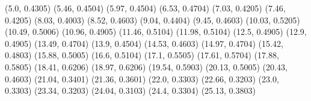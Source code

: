 (5.0, 0.4305)
(5.46, 0.4504)
(5.97, 0.4504)
(6.53, 0.4704)
(7.03, 0.4205)
(7.46, 0.4205)
(8.03, 0.4003)
(8.52, 0.4603)
(9.04, 0.4404)
(9.45, 0.4603)
(10.03, 0.5205)
(10.49, 0.5006)
(10.96, 0.4905)
(11.46, 0.5104)
(11.98, 0.5104)
(12.5, 0.4905)
(12.9, 0.4905)
(13.49, 0.4704)
(13.9, 0.4504)
(14.53, 0.4603)
(14.97, 0.4704)
(15.42, 0.4803)
(15.88, 0.5005)
(16.6, 0.5104)
(17.1, 0.5505)
(17.61, 0.5704)
(17.88, 0.5805)
(18.41, 0.6206)
(18.97, 0.6206)
(19.54, 0.5903)
(20.13, 0.5005)
(20.43, 0.4603)
(21.04, 0.3401)
(21.36, 0.3601)
(22.0, 0.3303)
(22.66, 0.3203)
(23.0, 0.3303)
(23.34, 0.3203)
(24.04, 0.3103)
(24.4, 0.3304)
(25.13, 0.3803)
